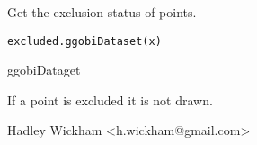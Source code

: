 \begin{Description}\relax
Get the exclusion status of points.
\end{Description}
\begin{Usage}
\begin{verbatim}excluded.ggobiDataset(x)\end{verbatim}
\end{Usage}
\begin{Arguments}
\begin{ldescription}
\item[\code{x}] ggobiDataget
\end{ldescription}
\end{Arguments}
\begin{Details}\relax
If a point is excluded it is not drawn.
\end{Details}
\begin{Author}\relax
Hadley Wickham <h.wickham@gmail.com>
\end{Author}
\begin{SeeAlso}\relax
{}
\end{SeeAlso}
\begin{Examples}
\begin{ExampleCode}\end{ExampleCode}
\end{Examples}

